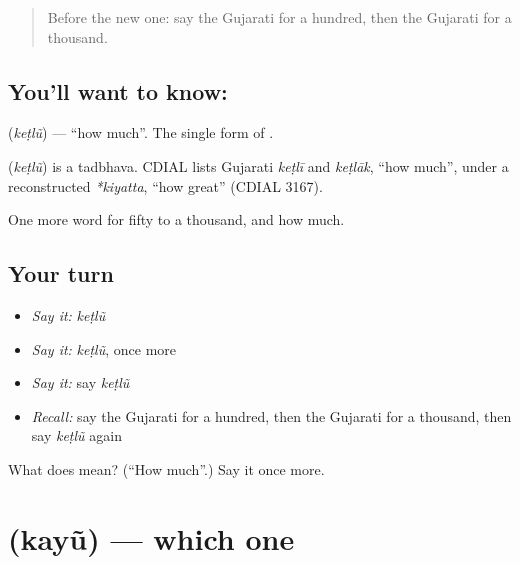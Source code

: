 \label{lesson:GU-C83-howmuch}



\begin{quote}
Before the new one: say the Gujarati for a hundred, then the Gujarati for a thousand.
\end{quote}

\subsection*{You'll want to know: }
\textbf{} (\emph{keṭlũ}) — \textquotedblleft{}how much\textquotedblright{}. The single form of \textbf{}.

\begin{cousinweb}
\textbf{} (\emph{keṭlũ}) is a tadbhava. CDIAL lists Gujarati \emph{keṭlī} and \emph{keṭlāk}, \textquotedblleft{}how much\textquotedblright{}, under a reconstructed \emph{*kiyatta}, \textquotedblleft{}how great\textquotedblright{} (CDIAL 3167).
\end{cousinweb}

\begin{grammarlens}[title={What you've built}]
One more word for fifty to a thousand, and how much.
\end{grammarlens}

\subsection*{Your turn}
\begin{itemize}
\raggedright
  \item \emph{Say it:} \emph{keṭlũ}
  \item \emph{Say it:} \emph{keṭlũ}, once more
  \item \emph{Say it:} say \emph{keṭlũ}
  \item \emph{Recall:} say the Gujarati for a hundred, then the Gujarati for a thousand, then say \emph{keṭlũ} again
\end{itemize}

\begin{tcolorbox}[breakable,colback=teal!4,colframe=teal!35!black,title={Before you move on}]
What does  mean? (\textquotedblleft{}How much\textquotedblright{}.) Say it once more.
\end{tcolorbox}
\section[\texorpdfstring{\gu{કયું} (kayũ)}{કયું (kayũ)}]{ (kayũ) — which one}

